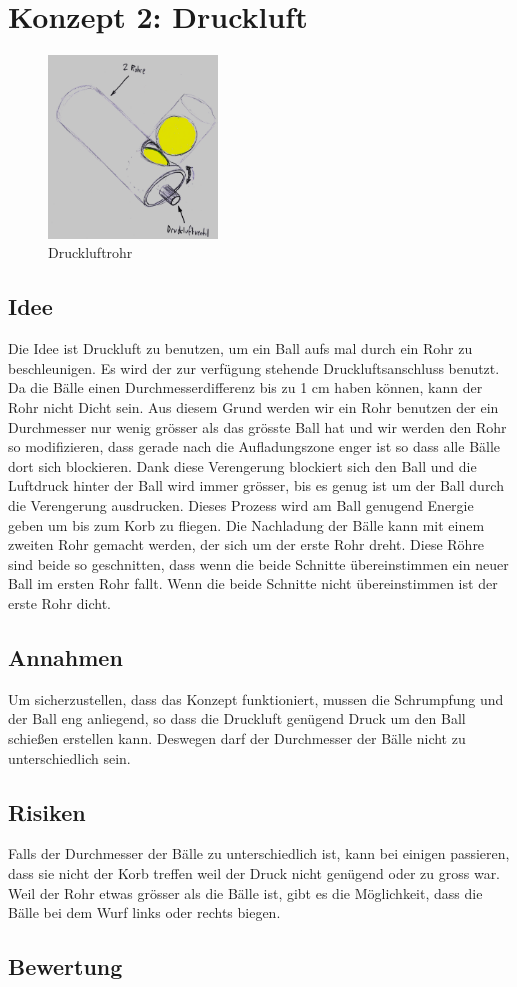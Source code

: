 \section{Konzept 2: Druckluft}
\begin{figure}[h!]
	\centering
	\includegraphics[width=0.4\textwidth]{../../fig/Druckluftrohr.jpg}
	\caption{Druckluftrohr}
	\label{fig:druckluftrohr}
\end{figure}
\subsection{Idee}
Die Idee ist Druckluft zu benutzen, um ein Ball aufs mal durch ein Rohr zu beschleunigen. Es wird der zur verfügung stehende Druckluftsanschluss benutzt. Da die Bälle einen Durchmesserdifferenz bis zu 1 cm haben können, kann der Rohr nicht Dicht sein. Aus diesem Grund werden wir ein Rohr benutzen der ein Durchmesser nur wenig grösser als das grösste Ball hat und wir werden den Rohr so modifizieren, dass gerade nach die Aufladungszone enger ist so dass alle Bälle dort sich blockieren. Dank diese Verengerung blockiert sich den Ball und die Luftdruck hinter der Ball wird immer grösser, bis es genug ist um der Ball durch die Verengerung ausdrucken. Dieses Prozess wird am Ball genugend Energie geben um bis zum Korb zu fliegen.
Die Nachladung der Bälle kann mit einem zweiten Rohr gemacht werden, der sich um der erste Rohr dreht. Diese Röhre sind beide so geschnitten, dass wenn die beide Schnitte übereinstimmen ein neuer Ball im ersten Rohr fallt. Wenn die beide Schnitte nicht übereinstimmen ist der erste Rohr dicht.
\subsection{Annahmen}
Um sicherzustellen, dass das Konzept funktioniert, mussen die Schrumpfung und der Ball eng anliegend, so dass die Druckluft genügend Druck um den Ball schießen erstellen kann. Deswegen darf der Durchmesser der Bälle nicht zu unterschiedlich sein. 

\subsection{Risiken}
Falls der Durchmesser der Bälle zu unterschiedlich ist, kann bei einigen passieren, dass sie nicht der Korb treffen weil der Druck nicht genügend oder zu gross war. Weil der Rohr etwas grösser als die Bälle ist, gibt es die Möglichkeit, dass die Bälle bei dem Wurf links oder rechts biegen. 

\subsection{Bewertung}
